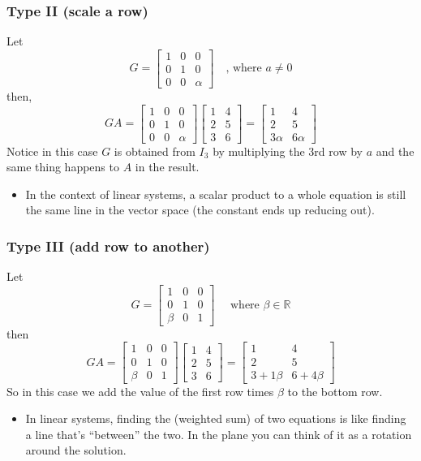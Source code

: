 \documentclass[10pt]{article}
\begin{document}
\subsubsection*{Type II (scale a row)}
Let
\[G = \begin{bmatrix} 1 & 0 & 0 \\ 0 & 1 & 0 \\ 0 & 0 & \alpha \end{bmatrix}\quad \text{, where }a \neq 0\]
then,
\[GA = \begin{bmatrix} 1 & 0 & 0 \\ 0 & 1 & 0 \\ 0 & 0 & \alpha \end{bmatrix} \begin{bmatrix} 1 & 4 \\ 2 & 5 \\ 3 & 6 \end{bmatrix} = \begin{bmatrix} 1 & 4 \\ 2 & 5 \\ 3\alpha & 6\alpha \end{bmatrix}\]
Notice in this case $G$ is obtained from $I_3$ by multiplying the 3rd row by $a$ and the same thing happens to $A$ in the result.
\begin{itemize}
	\item In the context of linear systems, a scalar product to a whole equation is still the same line in the vector space (the constant ends up reducing out).
\end{itemize}

\subsubsection*{Type III (add row to another)}
Let 
\[G = \begin{bmatrix} 1 & 0 & 0 \\ 0 & 1 & 0 \\ \beta & 0 & 1 \end{bmatrix}\quad \text{ where } \beta \in \mathbb{R}\]
then
\[GA = \begin{bmatrix} 1 & 0 & 0 \\ 0 & 1 & 0 \\ \beta & 0 & 1 \end{bmatrix} \begin{bmatrix} 1 & 4 \\ 2 & 5 \\ 3 & 6 \end{bmatrix} = \begin{bmatrix} 1 & 4 \\ 2 & 5 \\ 3 + 1\beta & 6 + 4\beta \end{bmatrix}\]
So in this case we add the value of the first row times $\beta$ to the bottom row.
\begin{itemize}
	\item In linear systems, finding the (weighted sum) of two equations is like finding a line that's ``between'' the two.  In the plane you can think of it as a rotation around the solution.
\end{itemize}
\end{document}
